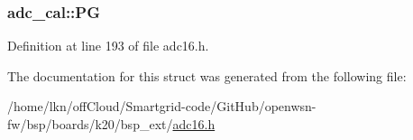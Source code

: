\subsubsection[{\texorpdfstring{PG}{PG}}]{ adc\+\_\+cal\+::\+PG}\hypertarget{structadc__cal_a47b0863c244297eb0c8d295dad498501}{}\label{structadc__cal_a47b0863c244297eb0c8d295dad498501}


Definition at line 193 of file adc16.\+h.



The documentation for this struct was generated from the following file\+:\begin{DoxyCompactItemize}
\item 
/home/lkn/off\+Cloud/\+Smartgrid-\/code/\+Git\+Hub/openwsn-\/fw/bsp/boards/k20/bsp\+\_\+ext/\hyperlink{adc16_8h}{adc16.\+h}\end{DoxyCompactItemize}
